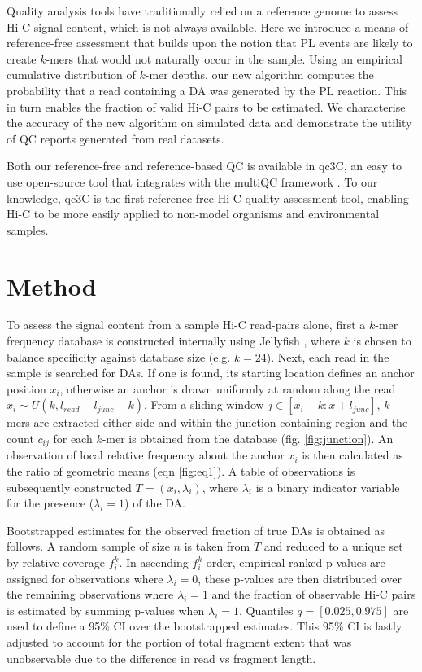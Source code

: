 \documentclass[a0,landscape]{a0poster}
\begin{document}
\begin{multicols}{4}
Quality analysis tools have traditionally relied on a reference genome to assess Hi-C signal content, which is not always available. Here we introduce a means of reference-free assessment that builds upon the notion that PL events are likely to create $k$-mers that would not naturally occur in the sample. Using an empirical cumulative distribution of $k$-mer depths, our new algorithm computes the probability that a read containing a DA was generated by the PL reaction. This in turn enables the fraction of valid Hi-C pairs to be estimated. We characterise the accuracy of the new algorithm on simulated data and demonstrate the utility of QC reports generated from real datasets.

Both our reference-free and reference-based QC is available in qc3C, an easy to use open-source tool that integrates with the multiQC framework \cite{Ewels2016-up}. To our knowledge, qc3C is the first reference-free Hi-C quality assessment tool, enabling Hi-C to be more easily applied to non-model organisms and environmental samples.


\section*{Method}

To assess the signal content from a sample Hi-C read-pairs alone, first a $k$-mer frequency database is constructed internally using Jellyfish \cite{Marcais2012-bc}, where $k$ is chosen to balance specificity against database size (e.g. $k=24$). Next, each read in the sample is searched for DAs. If one is found, its starting location defines an anchor position $x_i$, otherwise an anchor is drawn uniformly at random along the read $x_i \sim U(k, l_{read}-l_{junc}-k)$. From a sliding window $j \in [x_i-k:x+l_{junc}]$, $k$-mers are extracted either side and within the junction containing region and the count $c_{ij}$ for each $k$-mer is obtained from the database (fig. \ref{fig:junction}). An observation of local relative frequency about the anchor $x_i$ is then calculated as the ratio of geometric means (eqn \ref{fig:eq1}). A table of observations is subsequently constructed $T = (x_i, \lambda_i)$, where $\lambda_i$ is a binary indicator variable for the presence ($\lambda_i=1$) of the DA.

Bootstrapped estimates for the observed fraction of true DAs is obtained as follows. A random sample of size $n$ is taken from $T$ and reduced to a unique set by relative coverage $f^k_i$. In ascending $f^k_i$ order, empirical ranked p-values are assigned for observations where $\lambda_i=0$, these p-values are then distributed over the remaining observations where $\lambda_i=1$ and the fraction of observable Hi-C pairs is estimated by summing p-values when $\lambda_i=1$. Quantiles $q=[0.025, 0.975]$ are used to define a 95\% CI over the bootstrapped estimates. This 95\% CI is lastly adjusted to account for the portion of total fragment extent that was unobservable due to the difference in read vs fragment length.


\end{multicols}
\end{document}
